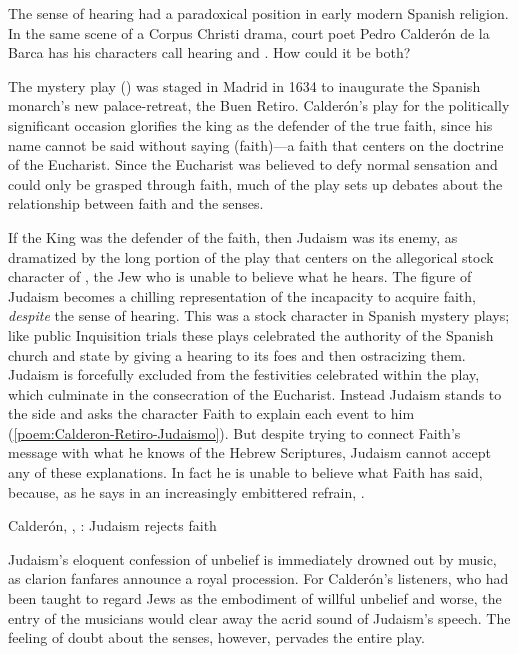 The sense of hearing had a paradoxical position in early modern Spanish
religion.
In the same scene of a Corpus Christi drama, court poet Pedro Calderón de la
Barca has his characters call hearing 
and .
How could it be both?

The mystery play () 
was staged in Madrid in 1634 to inaugurate the Spanish monarch's new
palace-retreat, the Buen Retiro.%
    \Autocite{Calderon:Retiro}
Calderón's play for the politically significant occasion glorifies the king as
the defender of the true faith, since his name  cannot be said
without saying  (faith)---a faith that centers on the doctrine of the
Eucharist.%
    \Autocite[\poemline{\XXX}]{Calderon:Retiro}
Since the Eucharist was believed to defy normal sensation and could only be
grasped through faith, much of the play sets up debates about the relationship
between faith and the senses.

If the King was the defender of the faith, then Judaism was its enemy, as
dramatized by the long portion of the play that centers on the allegorical
stock character of , the Jew who is unable to believe what he
hears.
The figure of Judaism becomes a chilling representation of the incapacity to
acquire faith, \emph{despite} the sense of hearing.
This was a stock character in Spanish mystery plays; like public Inquisition
trials these plays celebrated the authority of the Spanish church and state by
giving a hearing to its foes and then ostracizing them.
Judaism is forcefully excluded from the festivities celebrated within the play,
which culminate in the consecration of the Eucharist.
Instead Judaism stands to the side and asks the character Faith to explain each
event to him (\cref{poem:Calderon-Retiro-Judaismo}).
But despite trying to connect Faith's message with what he knows of the Hebrew
Scriptures, Judaism cannot accept any of these explanations.
In fact he is unable to believe what Faith has said, because, as he says in an
increasingly embittered refrain, .

{Calderón, , :
Judaism rejects faith}

Judaism's eloquent confession of unbelief is immediately drowned out by music,
as clarion fanfares announce a royal procession.
For Calderón's listeners, who had been taught to regard Jews as the embodiment
of willful unbelief and worse, the entry of the musicians would clear away the
acrid sound of Judaism's speech.
The feeling of doubt about the senses, however, pervades the entire play.

